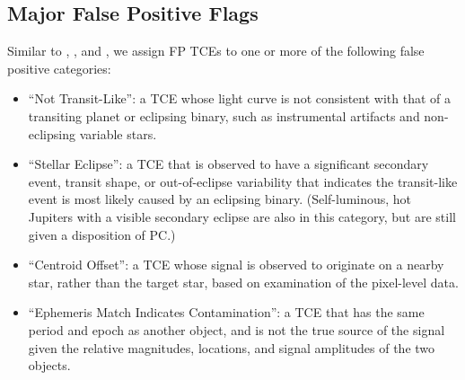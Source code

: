 %
%

\subsection{Major False Positive Flags}
Similar to \citet{Rowe2015a}, \citep{Mullally2015cat}, and \citet{Coughlin2016}, we assign FP TCEs to one or more of the following false positive categories:


\begin{itemize}
  \item ``Not Transit-Like'': a TCE whose light curve is not consistent with that of a transiting planet or eclipsing binary, such as instrumental artifacts and non-eclipsing variable stars.
  \item ``Stellar Eclipse'': a TCE that is observed to have a significant secondary event, transit shape, or out-of-eclipse variability that indicates the transit-like event is most likely caused by an eclipsing binary. (Self-luminous, hot Jupiters with a visible secondary eclipse are also in this category, but are still given a disposition of PC.)
  \item ``Centroid Offset'': a TCE whose signal is observed to originate on a nearby star, rather than the target star, based on examination of the pixel-level data.
  \item ``Ephemeris Match Indicates Contamination'': a TCE that has the same period and epoch as another object, and is not the true source of the signal given the relative magnitudes, locations, and signal amplitudes of the two objects.
\end{itemize}

